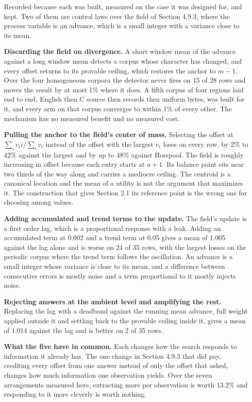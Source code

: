 Recorded because each was built, measured on the case it was designed for, and kept. Two of them are control laws over the field of Section 4.9.3, where the process variable is an advance, which is a small integer with a variance close to its mean.

\noindent\textbf{Discarding the field on divergence.} A short window mean of the advance against a long window mean detects a corpus whose character has changed, and every offset returns to its provable ceiling, which restores the anchor to \(m-1\). Over the four homogeneous corpora the detector never fires on 15 of 28 rows and moves the result by at most 1\% where it does. A fifth corpus of four regions laid end to end, English then C source then records then uniform bytes, was built for it, and every arm on that corpus converges to within 1\% of every other. The mechanism has no measured benefit and no measured cost.

\noindent\textbf{Pulling the anchor to the field's center of mass.} Selecting the offset at \(\sum_i v_i i / \sum_i v_i\) instead of the offset with the largest \(v_i\) loses on every row, by 2\% to 42\% against the largest and by up to 48\% against Horspool. The field is roughly increasing in offset because each entry starts at \(a+1\). Its balance point sits near two thirds of the way along and carries a mediocre ceiling. The centroid is a canonical location and the mean of a utility is not the argument that maximizes it. The construction that gives Section 2.1 its reference point is the wrong one for choosing among values.

\noindent\textbf{Adding accumulated and trend terms to the update.} The field's update is a first order lag, which is a proportional response with a leak. Adding an accumulated term at 0.002 and a trend term at 0.05 gives a mean of 1.005 against the lag alone and is worse on 24 of 35 rows, with the largest losses on the periodic corpus where the trend term follows the oscillation. An advance is a small integer whose variance is close to its mean, and a difference between consecutive errors is mostly noise and a term proportional to it mostly injects noise.

\noindent\textbf{Rejecting answers at the ambient level and amplifying the rest.} Replacing the lag with a deadband against the running mean advance, full weight applied outside it and settling back to the provable ceiling inside it, gives a mean of 1.014 against the lag and is better on 2 of 35 rows.

\noindent\textbf{What the five have in common.} Each changes how the search responds to information it already has. The one change in Section 4.9.3 that did pay, crediting every offset from one answer instead of only the offset that asked, changes how much information one observation yields. Over the seven arrangements measured here, extracting more per observation is worth 13.2\% and responding to it more cleverly is worth nothing.

